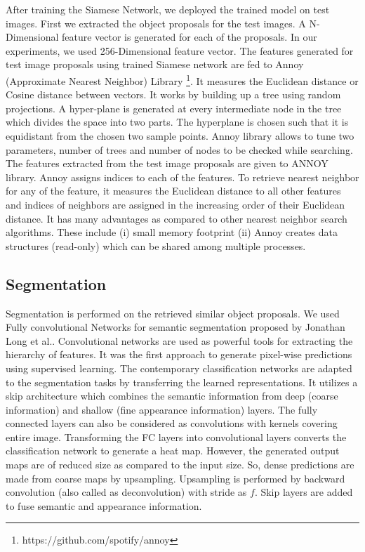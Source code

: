 \documentclass[conference]{IEEEtran}
\begin{document}
After training the Siamese Network, we deployed the trained model on test images. First we extracted the object proposals for the test images. A N-Dimensional feature vector is generated for each of the proposals. In our experiments, we used 256-Dimensional feature vector. The features generated for test image proposals using trained Siamese network are fed to Annoy (Approximate Nearest Neighbor) Library \footnote{https://github.com/spotify/annoy}. It measures the Euclidean distance or Cosine distance between vectors. It works by building up a tree using random projections. A hyper-plane is generated at every intermediate node in the tree which divides the space into two parts. The hyperplane is chosen such that it is equidistant from the chosen two sample points. Annoy library allows to tune two parameters, number of trees and number of nodes to be checked while searching. The features extracted from the test image proposals are given to ANNOY library. Annoy assigns indices to each of the features. To retrieve nearest neighbor for any of the feature, it measures the Euclidean distance to all other features and indices of neighbors are assigned in the increasing order of their Euclidean distance. It has many advantages as compared to other nearest neighbor search algorithms. These include (i) small memory footprint (ii) Annoy creates data structures (read-only) which can be shared among multiple processes.
\subsection{Segmentation}
\label{sec:segment}
Segmentation is performed on the retrieved similar object proposals. We used Fully convolutional Networks for semantic segmentation proposed by Jonathan Long et al.\cite{long2015fully}. Convolutional networks are used as powerful tools for extracting the hierarchy of features. It was the first approach to generate pixel-wise predictions using supervised learning.  The contemporary classification networks are adapted to the segmentation tasks by transferring the learned representations. It utilizes a skip architecture which combines the semantic information from deep (coarse information) and shallow (fine appearance information) layers. %
The fully connected layers can also be considered as convolutions with kernels covering entire image. 
Transforming the FC layers into convolutional layers converts the classification network to generate a heat map. However, the generated output maps are of reduced size as compared to the input size. So, dense predictions are made from coarse maps by upsampling. Upsampling is performed by backward convolution (also called as deconvolution) with stride as $f$. Skip layers are added to fuse semantic and appearance information. 
\end{document}
